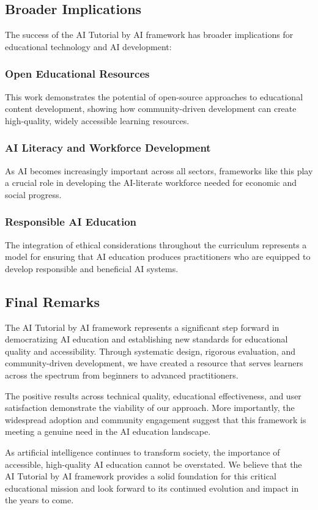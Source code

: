 \subsection{Broader Implications}

The success of the AI Tutorial by AI framework has broader implications for educational technology and AI development:

\subsubsection{Open Educational Resources}

This work demonstrates the potential of open-source approaches to educational content development, showing how community-driven development can create high-quality, widely accessible learning resources.

\subsubsection{AI Literacy and Workforce Development}

As AI becomes increasingly important across all sectors, frameworks like this play a crucial role in developing the AI-literate workforce needed for economic and social progress.

\subsubsection{Responsible AI Education}

The integration of ethical considerations throughout the curriculum represents a model for ensuring that AI education produces practitioners who are equipped to develop responsible and beneficial AI systems.

\subsection{Final Remarks}

The AI Tutorial by AI framework represents a significant step forward in democratizing AI education and establishing new standards for educational quality and accessibility. Through systematic design, rigorous evaluation, and community-driven development, we have created a resource that serves learners across the spectrum from beginners to advanced practitioners.

The positive results across technical quality, educational effectiveness, and user satisfaction demonstrate the viability of our approach. More importantly, the widespread adoption and community engagement suggest that this framework is meeting a genuine need in the AI education landscape.

As artificial intelligence continues to transform society, the importance of accessible, high-quality AI education cannot be overstated. We believe that the AI Tutorial by AI framework provides a solid foundation for this critical educational mission and look forward to its continued evolution and impact in the years to come.